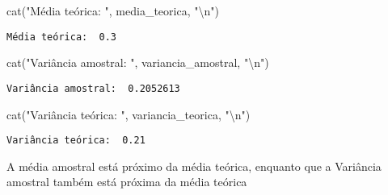 \documentclass[
  letterpaper,
  DIV=11,
  numbers=noendperiod]{scrreprt}
\newenvironment{Shaded}{\begin{snugshade}}{\end{snugshade}}
\newcommand{\FunctionTok}[1]{\textcolor[rgb]{0.28,0.35,0.67}{#1}}
\newcommand{\NormalTok}[1]{\textcolor[rgb]{0.00,0.23,0.31}{#1}}
\newcommand{\SpecialCharTok}[1]{\textcolor[rgb]{0.37,0.37,0.37}{#1}}
\newcommand{\StringTok}[1]{\textcolor[rgb]{0.13,0.47,0.30}{#1}}
\begin{document}
\begin{Shaded}
\begin{Highlighting}[]
\FunctionTok{cat}\NormalTok{(}\StringTok{"Média teórica: "}\NormalTok{, media\_teorica, }\StringTok{"}\SpecialCharTok{\textbackslash{}n}\StringTok{"}\NormalTok{)}
\end{Highlighting}
\end{Shaded}

\begin{verbatim}
Média teórica:  0.3 
\end{verbatim}

\begin{Shaded}
\begin{Highlighting}[]
\FunctionTok{cat}\NormalTok{(}\StringTok{"Variância amostral: "}\NormalTok{, variancia\_amostral, }\StringTok{"}\SpecialCharTok{\textbackslash{}n}\StringTok{"}\NormalTok{)}
\end{Highlighting}
\end{Shaded}

\begin{verbatim}
Variância amostral:  0.2052613 
\end{verbatim}

\begin{Shaded}
\begin{Highlighting}[]
\FunctionTok{cat}\NormalTok{(}\StringTok{"Variância teórica: "}\NormalTok{, variancia\_teorica, }\StringTok{"}\SpecialCharTok{\textbackslash{}n}\StringTok{"}\NormalTok{)}
\end{Highlighting}
\end{Shaded}

\begin{verbatim}
Variância teórica:  0.21 
\end{verbatim}

A média amostral está próximo da média teórica, enquanto que a Variância
amostral também está próxima da média teórica
\end{document}
